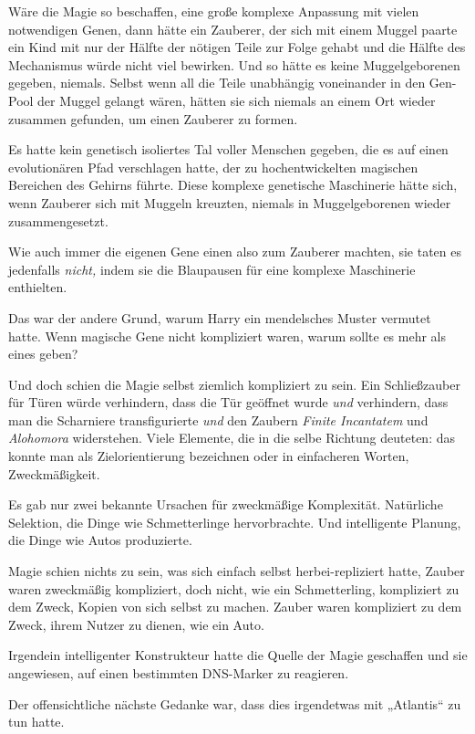 {Wäre die Magie so beschaffen, eine große komplexe Anpassung mit vielen notwendigen Genen, dann hätte ein Zauberer, der sich mit einem Muggel paarte ein Kind mit nur der Hälfte der nötigen Teile zur Folge gehabt und die Hälfte des Mechanismus würde nicht viel bewirken. Und so hätte es keine Muggelgeborenen gegeben, niemals. Selbst wenn all die Teile unabhängig voneinander in den Gen-Pool der Muggel gelangt wären, hätten sie sich niemals an einem Ort wieder zusammen gefunden, um einen Zauberer zu formen.

Es hatte kein genetisch isoliertes Tal voller Menschen gegeben, die es auf einen evolutionären Pfad verschlagen hatte, der zu hochentwickelten magischen Bereichen des Gehirns führte. Diese komplexe genetische Maschinerie hätte sich, wenn Zauberer sich mit Muggeln kreuzten, niemals in Muggelgeborenen wieder zusammengesetzt.

Wie auch immer die eigenen Gene einen also zum Zauberer machten, sie taten es jedenfalls \emph{nicht,} indem sie die Blaupausen für eine komplexe Maschinerie enthielten.

Das war der andere Grund, warum Harry ein mendelsches Muster vermutet hatte. Wenn magische Gene nicht kompliziert waren, warum sollte es mehr als eines geben?

Und doch schien die Magie selbst ziemlich kompliziert zu sein. Ein Schließzauber für Türen würde verhindern, dass die Tür geöffnet wurde \emph{und} verhindern, dass man die Scharniere transfigurierte \emph{und} den Zaubern \emph{Finite Incantatem} und \emph{Alohomora} widerstehen. Viele Elemente, die in die selbe Richtung deuteten: das konnte man als Zielorientierung bezeichnen oder in einfacheren Worten, Zweckmäßigkeit.

Es gab nur zwei bekannte Ursachen für zweckmäßige Komplexität. Natürliche Selektion, die Dinge wie Schmetterlinge hervorbrachte. Und intelligente Planung, die Dinge wie Autos produzierte.

Magie schien nichts zu sein, was sich einfach selbst herbei-repliziert hatte, Zauber waren zweckmäßig kompliziert, doch nicht, wie ein Schmetterling, kompliziert zu dem Zweck, Kopien von sich selbst zu machen. Zauber waren kompliziert zu dem Zweck, ihrem Nutzer zu dienen, wie ein Auto.

Irgendein intelligenter Konstrukteur hatte die Quelle der Magie geschaffen und sie angewiesen, auf einen bestimmten DNS-Marker zu reagieren.

Der offensichtliche nächste Gedanke war, dass dies irgendetwas mit „Atlantis“ zu tun hatte.

}
